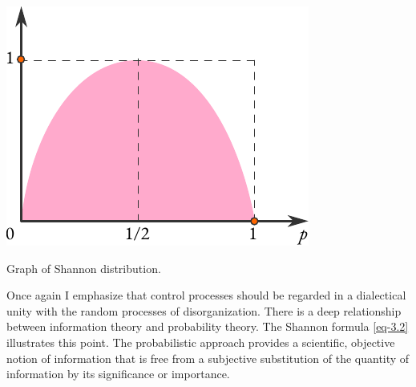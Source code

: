 \begin{marginfigure}%
 \centering
 \includegraphics[width=\linewidth]{figures/shannon-distro.pdf}
\caption{Graph of Shannon distribution.\label{shannon-distro}}
 \end{marginfigure}


Once again I emphasize that control processes should be regarded in
a dialectical unity with the random processes of disorganization. There
is a deep relationship between information theory and probability
theory. The Shannon formula \eqref{eq-3.2} illustrates this point. The
probabilistic approach provides a scientific, objective notion of
information that is free from a subjective substitution of the quantity of
information by its significance or importance.



